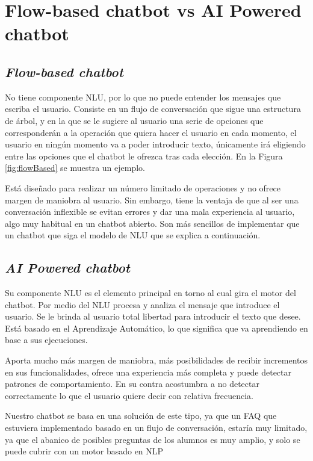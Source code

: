 \newpage

\section{Flow-based chatbot vs AI Powered chatbot}

\subsection{\textit{Flow-based chatbot}}
No tiene componente NLU, por lo que no puede entender los mensajes que escriba el usuario. Consiste en un flujo de conversación que sigue una estructura de árbol, y en la que se le sugiere al usuario una serie de opciones que corresponderán a la operación que quiera hacer el usuario en cada momento, el usuario en ningún momento va a poder introducir texto, únicamente irá eligiendo entre las opciones que el chatbot le ofrezca tras cada elección. En la Figura \ref{fig:flowBased} se muestra un ejemplo.



Está diseñado para realizar un número limitado de operaciones y no ofrece margen de maniobra al usuario. Sin embargo, tiene la ventaja de que al ser una conversación inflexible se evitan errores y dar una mala experiencia al usuario, algo muy habitual en un chatbot abierto. Son más sencillos de implementar que un chatbot que siga el modelo de NLU que se explica a continuación.

\subsection{\textit{AI Powered chatbot}}
Su componente NLU es el elemento principal en torno al cual gira el motor del chatbot. Por medio del NLU procesa y analiza el mensaje que introduce el usuario. Se le brinda al usuario total libertad para introducir el texto que desee. Está basado en el Aprendizaje Automático, lo que significa que va aprendiendo en base a sus ejecuciones.

Aporta mucho más margen de maniobra, más posibilidades de recibir incrementos en sus funcionalidades, ofrece una experiencia más completa y puede detectar patrones de comportamiento. En su contra acostumbra a no detectar correctamente lo que el usuario quiere decir con relativa frecuencia.

Nuestro chatbot se basa en una solución de este tipo, ya que un FAQ que estuviera implementado basado en un flujo de conversación, estaría muy limitado, ya que el abanico de posibles preguntas de los alumnos es muy amplio, y solo se puede cubrir con un motor basado en NLP 


